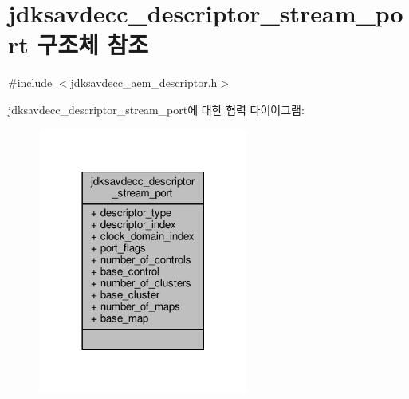 \hypertarget{structjdksavdecc__descriptor__stream__port}{}\section{jdksavdecc\+\_\+descriptor\+\_\+stream\+\_\+port 구조체 참조}
\label{structjdksavdecc__descriptor__stream__port}


{\ttfamily \#include $<$jdksavdecc\+\_\+aem\+\_\+descriptor.\+h$>$}



jdksavdecc\+\_\+descriptor\+\_\+stream\+\_\+port에 대한 협력 다이어그램\+:
\nopagebreak
\begin{figure}[H]
\begin{center}
\leavevmode
\includegraphics[width=194pt]{structjdksavdecc__descriptor__stream__port__coll__graph}
\end{center}
\end{figure}
